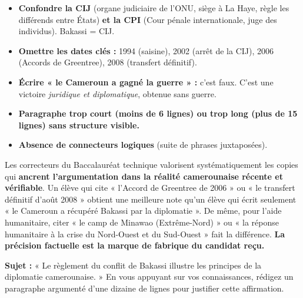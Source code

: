 \documentclass[11pt]{article}
\begin{document}
\begin{attention}
\begin{itemize}
    \item \textbf{Confondre la CIJ} (organe judiciaire de l'ONU, siège à La Haye, règle les différends entre États) \textbf{et la CPI} (Cour pénale internationale, juge des individus). Bakassi = CIJ.
    \item \textbf{Omettre les dates clés :} 1994 (saisine), 2002 (arrêt de la CIJ), 2006 (Accords de Greentree), 2008 (transfert définitif).
    \item \textbf{Écrire « le Cameroun a gagné la guerre » :} c'est faux. C'est une victoire \emph{juridique et diplomatique}, obtenue sans guerre.
    \item \textbf{Paragraphe trop court (moins de 6 lignes) ou trop long (plus de 15 lignes) sans structure visible.}
    \item \textbf{Absence de connecteurs logiques} (suite de phrases juxtaposées).
\end{itemize}
\end{attention}

\begin{savaistu}
Les correcteurs du Baccalauréat technique valorisent systématiquement les copies qui \textbf{ancrent l'argumentation dans la réalité camerounaise récente et vérifiable}. Un élève qui cite « l'Accord de Greentree de 2006 » ou « le transfert définitif d'août 2008 » obtient une meilleure note qu'un élève qui écrit seulement « le Cameroun a récupéré Bakassi par la diplomatie ». De même, pour l'aide humanitaire, citer « le camp de Minawao (Extrême-Nord) » ou « la réponse humanitaire à la crise du Nord-Ouest et du Sud-Ouest » fait la différence. \textbf{La précision factuelle est la marque de fabrique du candidat reçu.}
\end{savaistu}

\begin{exercice}
\textbf{Sujet :} « Le règlement du conflit de Bakassi illustre les principes de la diplomatie camerounaise. » En vous appuyant sur vos connaissances, rédigez un paragraphe argumenté d'une dizaine de lignes pour justifier cette affirmation.
\end{exercice}
\end{document}
